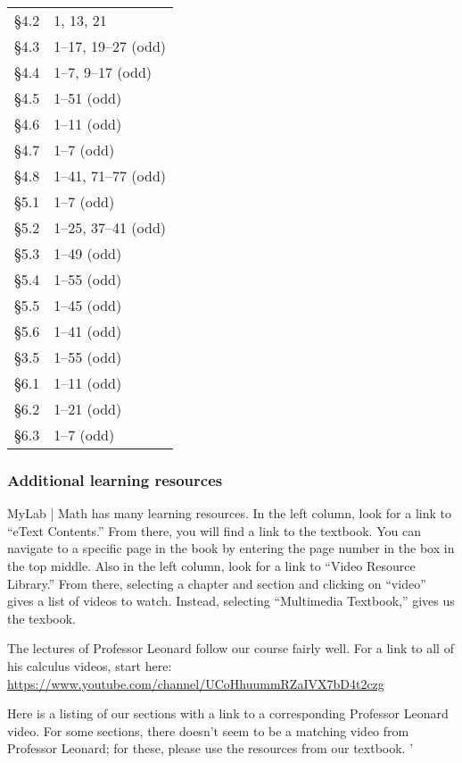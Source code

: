 \documentclass[12pt]{article}
\newcounter{ex}\setcounter{ex}{0}
\begin{document}
\begin{center}
\begin{minipage}{8.5in}
\begin{tabular}{|l | l |}
  \S4.2 & 1, 13, 21 \\
  \S4.3 & 1--17, 19--27 (odd) \\
  \S4.4 & 1--7, 9--17  (odd) \\
  \S4.5 & 1--51 (odd)  \\ 
  \S4.6 & 1--11 (odd) \\
  \S4.7 & 1--7 (odd) \\ 
  \S4.8 & 1--41, 71--77 (odd) \\ 
  \S5.1 & 1--7 (odd) \\ 
  \S5.2 & 1--25, 37--41 (odd) \\
  \S5.3 & 1--49 (odd) \\
  \S5.4 & 1--55 (odd) \\
  \S5.5 &  1--45 (odd)  \\
  \S5.6 & 1--41 (odd) \\
  \S3.5 & 1--55 (odd)    \\
  \S6.1 & 1--11 (odd) \\
  \S6.2 & 1--21 (odd) \\
  \S6.3  & 1--7 (odd) \\ \hline
\end{tabular}
\end{minipage}
\end{center}
\subsubsection*{Additional learning resources}


MyLab | Math has many learning resources. In the left column, look 
for a link to ``eText Contents.''  From there, you will find a 
link to the textbook.  You can navigate to a specific page in 
the book by
entering the page number in the box in the top middle.  Also in 
the left column, look for a link to ``Video Resource Library.''   From there, selecting a chapter and section and clicking on ``video'' gives a list of
videos to watch.  Instead, selecting ``Multimedia Textbook,'' 
gives us the texbook.

The lectures of Professor Leonard follow\vspace{0.5in} our course fairly well.  For a link to all of his calculus videos, start here: 
\url{https://www.youtube.com/channel/UCoHhuummRZaIVX7bD4t2czg   }

Here is a listing of our sections with a link to a corresponding 
Professor Leonard  video. For some sections, there doesn't seem to 
be a matching video from Professor Leonard; for these, please use 
the resources from our textbook.
'
\vspace{0.5in}
\end{document}
